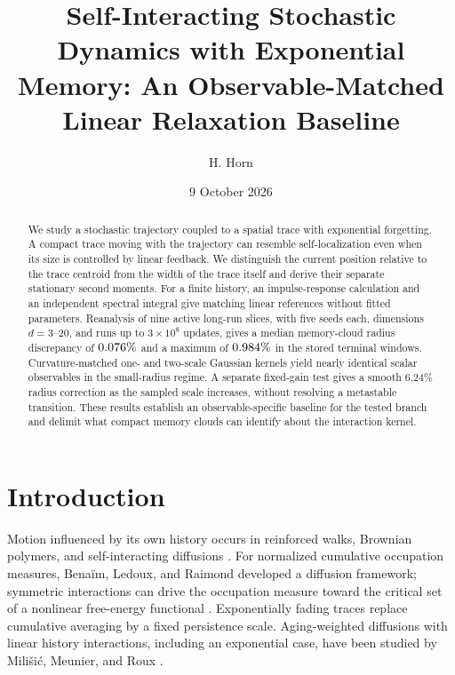 
\title{Self-Interacting Stochastic Dynamics with Exponential Memory:
An Observable-Matched Linear Relaxation Baseline}
\author{H. Horn}
\date{9 October 2026}

\begin{abstract}
We study a stochastic trajectory coupled to a spatial trace with exponential
forgetting. A compact trace moving with the trajectory can resemble
self-localization even when its size is controlled by linear feedback.
We distinguish the current position relative to the trace centroid from the
width of the trace itself and derive their separate stationary second
moments. For a finite history, an impulse-response calculation and an
independent spectral integral give matching linear references without fitted
parameters. Reanalysis of nine active long-run slices, with five seeds each,
dimensions $d=3$--$20$, and runs up to $3\times10^8$ updates, gives a median
memory-cloud radius discrepancy of $0.076\%$ and a maximum of
$0.984\%$ in the stored terminal windows. Curvature-matched one-
and two-scale Gaussian kernels yield nearly identical scalar observables in
the small-radius regime. A separate fixed-gain test gives a smooth $6.24\%$
radius correction as the sampled scale increases, without resolving a
metastable transition. These results establish an observable-specific
baseline for the tested branch and delimit what compact memory clouds can
identify about the interaction kernel.
\end{abstract}
\maketitle

\section{Introduction}
Motion influenced by its own history occurs in reinforced walks, Brownian
polymers, and self-interacting diffusions
\cite{Pemantle2007,DurrettRogers1992}.
For normalized cumulative occupation measures, Bena\"im, Ledoux, and Raimond
developed a diffusion framework; symmetric interactions can drive the
occupation measure toward the critical set of a nonlinear free-energy
functional \cite{BenAImRaimond2002,BenaimRaimond2005}.
Exponentially fading traces replace cumulative averaging by a fixed
persistence scale. Aging-weighted diffusions with linear history
interactions, including an exponential case, have been studied by
Mili\v{s}i\'c, Meunier, and Roux \cite{MilisicMeunierRoux2026}.

